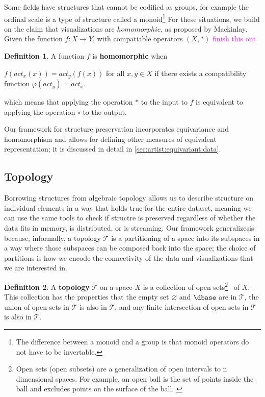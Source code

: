\documentclass[journal]{IEEEtran}
\newcommand{\note}[1]{\textcolor{magenta}{#1}}
\theoremstyle{definition}
\newtheorem{definition}{Definition}[section]
\theoremstyle{remark}
\begin{document}
Some fields have structures that cannot be codified as groups, for example the ordinal 
scale is a type of structure called a monoid\footnote{The difference between a monoid 
and a group is that monoid operators do not have to be invertable.} For these situations, 
we build on the claim that visualizations are $homomorphic$, as proposed by Mackinlay\cite{mackinlayAutomaticDesignGraphical1987}. Given the function $f: X \rightarrow Y$, with
compatiable operators $(X,*)$ \note{finish this out}


\begin{definition}\label{def:homomorphism}
  A function $f$ is \textbf{homomorphic} when 
  
  
  
  $f(act_x(x)) = act_y(f(x))$ for all $x, y \in X$ if there exists a compatibility function $\varphi(act_y) = act_x$. 


\end{definition}
which means that applying the operation $*$ to the input to $f$ is equivalent to applying the operation $\circ$ to the output. 



Our framework for structure preservation incorporates equivariance and homomorphism and allows for defining other measures of equivalent representation; it is discussed in detail in \autoref{sec:artist:equivariant:data}. 

 
\subsection{Topology}
Borrowing structures from algebraic topology allows us to describe structure on individual elements in a way that holds true for the entire dataset, meaning we can use the same tools to check if structre is preserved regardless of whether the data fits in memory, is distributed, or is streaming. Our framework generalizesis because, informally, a topology $\mathcal{T}$ is a partitioning of a space into its subspaces in a way where those subspaces can be composed back into the space; the choice of partitions is how we encode the connectivity of the data and visualizations that we are interested in. 

\begin{definition}
A \textbf{topology} $\mathcal{T}$ on a space $X$ is a collection of open sets\footnote{Open sets (open subsets) are a generalization of open intervals to n dimensional spaces. For example, an open ball is the set of points inside the ball and excludes points on the surface of the ball. \cite{weissteinOpenSet,bradleyTopologyVsTopology}} \openset\ of $X$. This collection has the properties that the empty set $\varnothing$ and $\dbase$ are in $\mathcal{T}$, the union of open sets in $\mathcal{T}$ is also in $\mathcal{T}$, and any finite intersection of open sets in $\mathcal{T}$ is also in $\mathscr{T}$. \cite{bradleyTopologyCategoricalApproach2020}
\end{definition}
\end{document}
